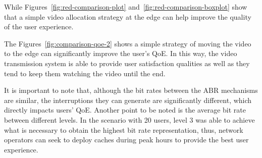 While Figures~\ref{fig:red-comparison-plot} and~\ref{fig:red-comparison-boxplot} show that a simple video allocation strategy at the edge can help improve the quality of the user experience.

The Figures~\ref{fig:comparison-qoe-2} shows a simple strategy of moving the video to the edge can significantly improve the user's QoE. In this way, the video transmission system is able to provide user satisfaction qualities as well as they tend to keep them watching the video until the end. 

It is important to note that, although the bit rates between the ABR mechanisms are similar, the interruptions they can generate are significantly different, which directly impacts users' QoE. Another point to be noted is the average bit rate between different levels. In the scenario with 20 users, level 3 was able to achieve what is necessary to obtain the highest bit rate representation, thus, network operators can seek to deploy caches during peak hours to provide the best user experience.





















































